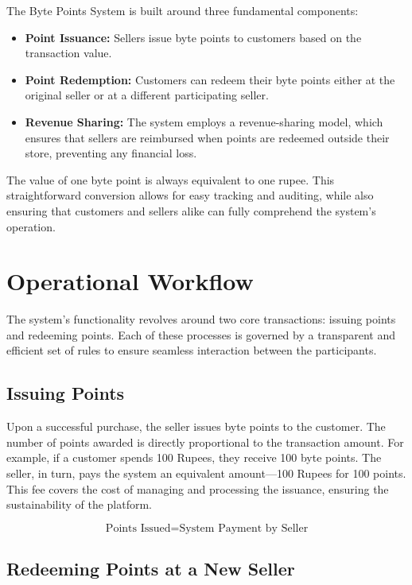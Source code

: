 \documentclass[a4paper,12pt]{article}
\begin{document}
The Byte Points System is built around three fundamental components:

\begin{itemize}
    \item \textbf{Point Issuance:} Sellers issue byte points to customers based on the transaction value.
    \item \textbf{Point Redemption:} Customers can redeem their byte points either at the original seller or at a different participating seller.
    \item \textbf{Revenue Sharing:} The system employs a revenue-sharing model, which ensures that sellers are reimbursed when points are redeemed outside their store, preventing any financial loss.
\end{itemize}

The value of one byte point is always equivalent to one rupee. This straightforward conversion allows for easy tracking and auditing, while also ensuring that customers and sellers alike can fully comprehend the system’s operation.

\section{Operational Workflow}

The system’s functionality revolves around two core transactions: issuing points and redeeming points. Each of these processes is governed by a transparent and efficient set of rules to ensure seamless interaction between the participants.

\subsection{Issuing Points}

Upon a successful purchase, the seller issues byte points to the customer. The number of points awarded is directly proportional to the transaction amount. For example, if a customer spends 100 Rupees, they receive 100 byte points. The seller, in turn, pays the system an equivalent amount—100 Rupees for 100 points. This fee covers the cost of managing and processing the issuance, ensuring the sustainability of the platform.

\[
\text{Points Issued} = \text{System Payment by Seller}
\]
\subsection{Redeeming Points at a New Seller}
\end{document}

